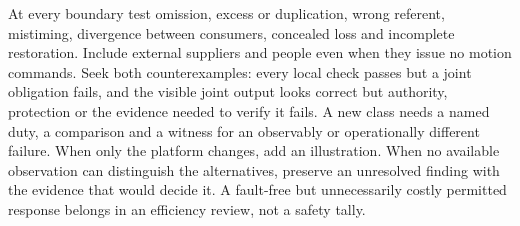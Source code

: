 \documentclass[11pt]{article}
\begin{document}
At every boundary test omission, excess or duplication, wrong referent, mistiming, divergence between consumers, concealed loss and incomplete restoration. Include external suppliers and people even when they issue no motion commands. Seek both counterexamples: every local check passes but a joint obligation fails, and the visible joint output looks correct but authority, protection or the evidence needed to verify it fails. A new class needs a named duty, a comparison and a witness for an observably or operationally different failure. When only the platform changes, add an illustration. When no available observation can distinguish the alternatives, preserve an unresolved finding with the evidence that would decide it. A fault-free but unnecessarily costly permitted response belongs in an efficiency review, not a safety tally.
\end{document}
